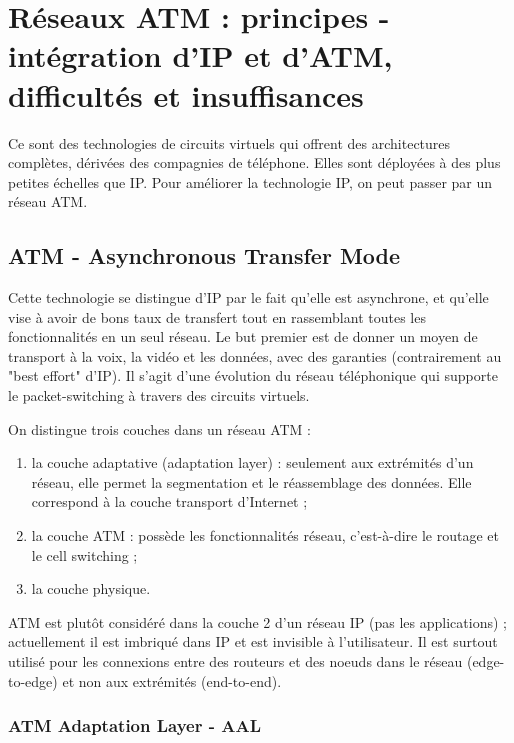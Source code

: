 \chapter{Réseaux ATM : principes - intégration d'IP et d'ATM, difficultés et insuffisances}

	
	Ce sont des technologies de circuits virtuels qui offrent des architectures complètes, dérivées des compagnies de téléphone. Elles sont déployées à des plus petites échelles que IP. Pour améliorer la technologie IP, on peut passer par un réseau ATM.
	
	\section{ATM - Asynchronous Transfer Mode}

	Cette technologie se distingue d'IP par le fait qu'elle est asynchrone, et qu'elle vise à avoir de bons taux de transfert tout en rassemblant toutes les fonctionnalités en un seul réseau.
	Le but premier est de donner un moyen de transport à la voix, la vidéo et les données, avec des garanties (contrairement au "best effort" d'IP). Il s'agit d'une évolution du réseau téléphonique qui supporte le packet-switching à travers des circuits virtuels.
	
	
	On distingue trois couches dans un réseau ATM : 
	
	\begin{enumerate}
		\item la couche adaptative (adaptation layer) : seulement aux extrémités d'un réseau, elle permet la segmentation et le réassemblage des données. Elle correspond à la couche transport d'Internet ;
		\item la couche ATM : possède les fonctionnalités réseau, c'est-à-dire le routage et le cell switching ;
		\item la couche physique.
	\end{enumerate}
	
	
	ATM est plutôt considéré dans la couche 2 d'un réseau IP (pas les applications) ; actuellement il est imbriqué dans IP et est invisible à l'utilisateur. Il est surtout utilisé pour les connexions entre des routeurs et des noeuds dans le réseau (edge-to-edge) et non aux extrémités (end-to-end).
	
		\subsection{ATM Adaptation Layer - AAL}
		
